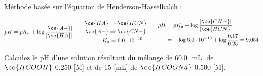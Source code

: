 \documentclass[
  11pt,
  a4paper,
  openany]{book}
\begin{document}
\begin{Answer}
Méthode basée sur l'équation de Henderson-Hasselbalch :

\[
\begin{split}
  pH = pK_a + \log \frac{|\ce{A-}|}{|\ce{HA}|}
\end{split}
\qquad
\begin{split}
  \ce{HA} \Rightarrow &\ \ce{HCN} \\
  \ce{A-} \Rightarrow &\ \ce{CN-} \\
  K_a = &\ 6.0 \cdot 10^{-10}
\end{split}
\qquad
\begin{split}
  pH &= pK_a + \log \frac{|\ce{CN-}|}{|\ce{HCN}|} \\
  &= - \log 6.0 \cdot 10^{-10} + \log \frac{0.17}{0.25} = 9.054 \\
\end{split}
\]

\end{Answer}

\clearpage

\begin{Exercise}
Calculez le pH d'une solution résultant du mélange de 60.0 {[}mL{]} de \(\ce{HCOOH}\) 0.250 {[}M{]} et de 15 {[}mL{]} de \(\ce{HCOONa}\) 0.500 {[}M{]}.

\end{Exercise}
\end{document}
